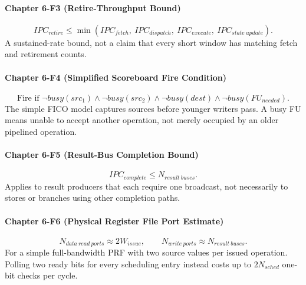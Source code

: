 \paragraph{Chapter 6-F3 (Retire-Throughput Bound)}\label{par:ch6-formula-3}
\begin{equation}\label{eq:app-ch6-formula-throughput}
    IPC_{retire}\le \min\!\left(IPC_{fetch},\ IPC_{dispatch},\ IPC_{execute},\ IPC_{state\ update}\right).
\end{equation}
A sustained-rate bound, not a claim that every short window has matching fetch and retirement counts.

\paragraph{Chapter 6-F4 (Simplified Scoreboard Fire Condition)}\label{par:ch6-formula-4}
\begin{equation}\label{eq:app-ch6-formula-fire}
    \text{Fire if } \neg busy(src_1)\wedge \neg busy(src_2)\wedge \neg busy(dest)\wedge \neg busy(FU_{needed}).
\end{equation}
The simple FICO model captures sources before younger writers pass. A busy FU means unable to accept another operation, not merely occupied by an older pipelined operation.

\paragraph{Chapter 6-F5 (Result-Bus Completion Bound)}\label{par:ch6-formula-5}
\begin{equation}\label{eq:app-ch6-formula-result-bus}
    IPC_{complete}\le N_{result\ buses}.
\end{equation}
Applies to result producers that each require one broadcast, not necessarily to stores or branches using other completion paths.

\paragraph{Chapter 6-F6 (Physical Register File Port Estimate)}\label{par:ch6-formula-6}
\begin{equation}\label{eq:app-ch6-formula-prf-ports}
    N_{data\ read\ ports}\approx 2W_{issue},\qquad
    N_{write\ ports}\approx N_{result\ buses}.
\end{equation}
For a simple full-bandwidth PRF with two source values per issued operation.
Polling two ready bits for every scheduling entry instead costs up to $2N_{sched}$ one-bit checks per cycle.

